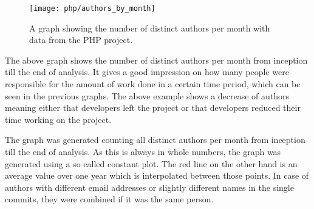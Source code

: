 \begin{figure}[h!t]
  \centering
  \texttt{[image: php/authors\_by\_month]}
  \caption[The Authors by Month Graph]
  {A graph showing the number of distinct authors per month with data from the
    PHP project.}
\end{figure}

The above graph shows the number of distinct authors per month from inception
till the end of analysis. It gives a good impression on how many people were
responsible for the amount of work done in a certain time period, which can be
seen in the previous graphs. The above example shows a decrease of authors
meaning either that developers left the project or that developers reduced
their time working on the project.

The graph was generated counting all distinct authors per month from inception
till the end of analysis. As this is always in whole numbers, the graph was
generated using a so called constant plot. The red line on the other hand is an
average value over one year which is interpolated between those points. In case
of authors with different email addresses or slightly different names in the
single commits, they were combined if it was the same person.



